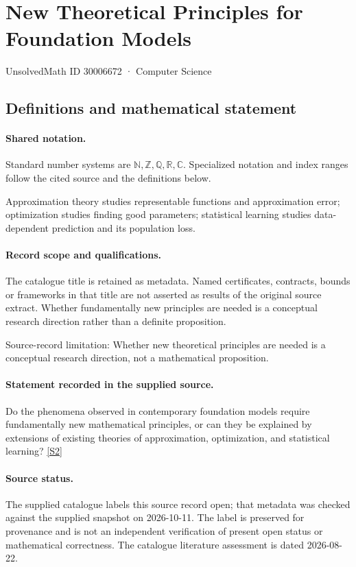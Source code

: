 \documentclass[11pt]{article}
\newcommand{\sref}[2]{\hyperlink{source:#1:#2}{[S#2]}}
\begin{document}
\setcounter{section}{30006671}
\section{New Theoretical Principles for Foundation Models}\label{30006672}
{\small\sffamily UnsolvedMath ID 30006672 · Computer Science}
\subsection{Definitions and mathematical statement}

\paragraph{Shared notation.}Standard number systems are $\mathbb N,\mathbb Z,\mathbb Q,\mathbb R,\mathbb C$. Specialized notation and index ranges follow the cited source and the definitions below.


Approximation theory studies representable functions and approximation error; optimization studies finding good parameters; statistical learning studies data-dependent prediction and its population loss.
\paragraph{Record scope and qualifications.}
The catalogue title is retained as metadata. Named certificates, contracts, bounds or frameworks in that title are not asserted as results of the original source extract.
Whether fundamentally new principles are needed is a conceptual research direction rather than a definite proposition.

Source-record limitation: Whether new theoretical principles are needed is a conceptual research direction, not a mathematical proposition.
\paragraph{Statement recorded in the supplied source.}
Do the phenomena observed in contemporary foundation models require fundamentally new mathematical principles, or can they be explained by extensions of existing theories of approximation, optimization, and statistical learning? \sref{30006672}{2}
\paragraph{Source status.}
The supplied catalogue labels this source record open; that metadata was checked against the supplied snapshot on 2026-10-11. The label is preserved for provenance and is not an independent verification of present open status or mathematical correctness. The catalogue literature assessment is dated 2026-08-22.
\end{document}
